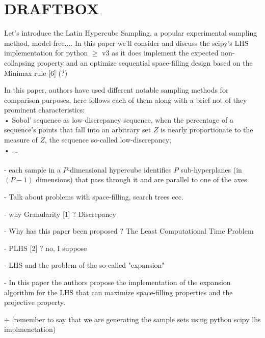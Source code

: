 \documentclass[12pt]{article}
\begin{document}
\section*{DRAFTBOX}
Let's introduce the Latin Hypercube Sampling, a popular experimental sampling method, model-free....
In this paper we'll consider and discuss the scipy's LHS implementation for python $\geq$ v3 as it does implement the expected non-collapsing property and an optimize sequential space-filling design based on the Minimax rule [6] (?)

In this paper, authors have used different notable sampling methods for comparison purposes, here follows each of them along with a brief not of they prominent characteristics: \\
• Sobol' sequence as low-discrepancy sequence, when the percentage of a sequence's points that fall into an arbitrary set $Z$ is nearly proportionate to the measure of $Z$, the sequence so-called low-discrepancy;\\
• ...
\\
\\

- each sample in a $P$-dimensional hypercube identifies $P$ sub-hyperplanes (in $(P-1)$ dimensions) that pass through it and are parallel to one of the axes

- Talk about problems with space-filling, search trees ecc.

- why Granularity [1] ? Discrepancy

- Why has this paper been proposed ? The Least Computational Time Problem

- PLHS [2] ? no, I suppose 

- LHS and the problem of the so-called "expansion"

- In this paper the authors propose the implementation of the expansion algorithm for the LHS that can maximize space-filling properties and the projective property.

+ [remember to say that we are generating the sample sets using python scipy lhs implmenetation)

\printbibliography
\end{document}
